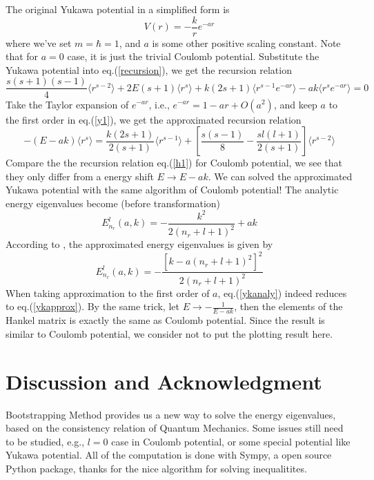 \documentclass[10pt]{article}
\begin{document}
The original Yukawa potential in a simplified form is
\begin{equation}
    V(r)=-\frac{k}{r}e^{-ar}
\end{equation}
where we've set $m=\hbar=1$, and $a$ is some other positive scaling constant. Note that for $a=0$ case, it is just the trivial Coulomb potential. Substitute the Yukawa potential into eq.(\ref{recursion}), we get the recursion relation
\begin{equation}\label{y1}
    \frac{s(s+1)(s-1)}{4}\langle r^{s-2}\rangle + 2E(s+1)\langle r^s\rangle + k(2s+1)\langle r^{s-1}e^{-ar}\rangle - ak\langle r^s e^{-ar}\rangle=0
\end{equation}
Take the Taylor expansion of $e^{-ar}$, i.e., $e^{-ar}=1-ar+O(a^2)$, and keep $a$ to the first order in eq.(\ref{y1}), we get the approximated recursion relation
\begin{equation}
    -(E-ak)\langle r^s\rangle = 
    \frac{k(2s+1)}{2(s+1)}\langle r^{s-1}\rangle
    +[\frac{s(s-1)}{8}-\frac{sl(l+1)}{2(s+1)}]\langle r^{s-2}\rangle
\end{equation}
Compare the the recursion relation eq.(\ref{h1}) for Coulomb potential, we see that they only differ from a energy shift $E\rightarrow E-ak$. We can solved the approximated Yukawa potential with the same algorithm of Coulomb potential! The analytic energy eigenvalues become (before transformation)
\begin{equation}\label{ykapprox}
    E^l_{n_r}(a,k)=-\frac{k^2}{2(n_r+l+1)^2}+ak
\end{equation}
According to \cite{approxyukawa}, the approximated energy eigenvalues is given by
\begin{equation}\label{ykanaly}
    E^l_{n_r}(a,k)=-\frac{[k-a(n_r+l+1)^2]^2}{2(n_r+l+1)^2}
\end{equation}
When taking approximation to the first order of $a$, eq.(\ref{ykanaly}) indeed reduces to eq.(\ref{ykapprox}). By the same trick, let $E\rightarrow -\frac{1}{E-ak}$, then the elements of the Hankel matrix is exactly the same as Coulomb potential. Since the result is similar to Coulomb potential, we consider not to put the plotting result here.

\section{Discussion and Acknowledgment }\label{sec:5}
Bootstrapping Method provides us a new way to solve the energy eigenvalues, based on the consistency relation of Quantum Mechanics. Some issues still need to be studied, e.g., $l=0$ case in Coulomb potential, or some special potential like Yukawa potential. All of the computation is done with Sympy\cite{sympy}, a open source Python package, thanks for the nice algorithm for solving inequalitites.

\newpage

\end{document}
